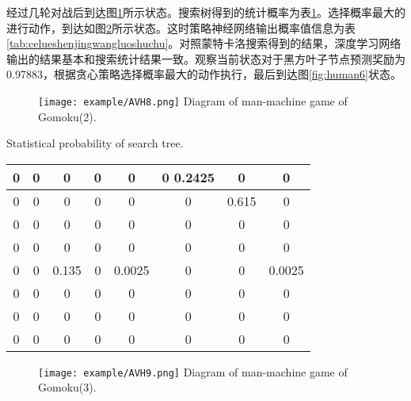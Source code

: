 经过几轮对战后到达图\ref{fig:human4}所示状态。搜索树得到的统计概率为表\ref{tab:moxinggailv3}。选择概率最大的进行动作，到达如图\ref{fig:human5}所示状态。这时策略神经网络输出概率值信息为表\ref{tab:celueshenjingwangluoshuchu}。对照蒙特卡洛搜索得到的结果，深度学习网络输出的结果基本和搜索统计结果一致。观察当前状态对于黑方叶子节点预测奖励为0.97883，根据贪心策略选择概率最大的动作执行，最后到达图\ref{fig:human6}状态。
\begin{figure}[htbp]
	\centering
	\texttt{[image: example/AVH8.png]}
	\hspace{0.5cm}
	{Diagram of man-machine game of Gomoku(2).}
	\label{fig:human4}
\end{figure}


\begin{table}[htbp]
	\centering
	{Statistical probability of search tree.}
	\label{tab:moxinggailv3}
\begin{tabular}{|c|c|c|c|c|c|c|c|}
	\hline 
	0& 0 & 0 &0  & 0 &0 0.2425 & 0 &0  \\ 
	\hline 
	0 & 0 & 0 & 0 & 0 & 0 & 0.615 & 0 \\ 
	\hline 
	0 & 0 & 0 & 0 & 0 & 0 & 0 & 0 \\ 
	\hline 
	0 & 0 & 0 & 0 & 0& 0 & 0 & 0 \\ 
	\hline 
	0 & 0 & 0.135 & 0 & 0.0025 & 0 & 0 & 0.0025 \\ 
	\hline 
	0 & 0 & 0 & 0 & 0 & 0 & 0 & 0 \\ 
	\hline 
	0 & 0 & 0 & 0 & 0 & 0 & 0 & 0 \\ 
	\hline 
	0 & 0 & 0 & 0 & 0 & 0 & 0 & 0 \\ 
	\hline 
\end{tabular}
\end{table}


\begin{figure}[htbp]
	\centering
	\texttt{[image: example/AVH9.png]}
	\hspace{0.5cm}
	{Diagram of man-machine game of Gomoku(3).}
	\label{fig:human5}
\end{figure}


